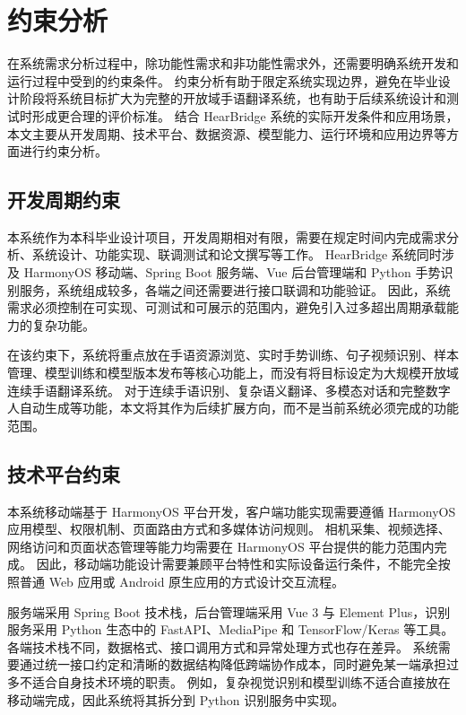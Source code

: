 
\section{约束分析}

在系统需求分析过程中，除功能性需求和非功能性需求外，还需要明确系统开发和运行过程中受到的约束条件。
约束分析有助于限定系统实现边界，避免在毕业设计阶段将系统目标扩大为完整的开放域手语翻译系统，也有助于后续系统设计和测试时形成更合理的评价标准。
结合 HearBridge 系统的实际开发条件和应用场景，本文主要从开发周期、技术平台、数据资源、模型能力、运行环境和应用边界等方面进行约束分析。

\subsection{开发周期约束}

本系统作为本科毕业设计项目，开发周期相对有限，需要在规定时间内完成需求分析、系统设计、功能实现、联调测试和论文撰写等工作。
HearBridge 系统同时涉及 HarmonyOS 移动端、Spring Boot 服务端、Vue 后台管理端和 Python 手势识别服务，系统组成较多，各端之间还需要进行接口联调和功能验证。
因此，系统需求必须控制在可实现、可测试和可展示的范围内，避免引入过多超出周期承载能力的复杂功能。

在该约束下，系统将重点放在手语资源浏览、实时手势训练、句子视频识别、样本管理、模型训练和模型版本发布等核心功能上，而没有将目标设定为大规模开放域连续手语翻译系统。
对于连续手语识别、复杂语义翻译、多模态对话和完整数字人自动生成等功能，本文将其作为后续扩展方向，而不是当前系统必须完成的功能范围。

\subsection{技术平台约束}

本系统移动端基于 HarmonyOS 平台开发，客户端功能实现需要遵循 HarmonyOS 应用模型、权限机制、页面路由方式和多媒体访问规则。
相机采集、视频选择、网络访问和页面状态管理等能力均需要在 HarmonyOS 平台提供的能力范围内完成。
因此，移动端功能设计需要兼顾平台特性和实际设备运行条件，不能完全按照普通 Web 应用或 Android 原生应用的方式设计交互流程。

服务端采用 Spring Boot 技术栈，后台管理端采用 Vue 3 与 Element Plus，识别服务采用 Python 生态中的 FastAPI、MediaPipe 和 TensorFlow/Keras 等工具。
各端技术栈不同，数据格式、接口调用方式和异常处理方式也存在差异。
系统需要通过统一接口约定和清晰的数据结构降低跨端协作成本，同时避免某一端承担过多不适合自身技术环境的职责。
例如，复杂视觉识别和模型训练不适合直接放在移动端完成，因此系统将其拆分到 Python 识别服务中实现。

